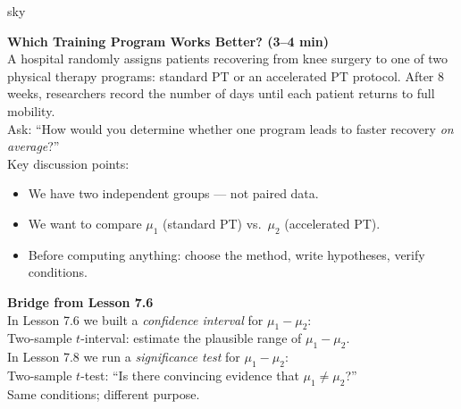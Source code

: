 \documentclass[10pt]{article}
\begin{document}
\begin{skillbox}[Hook]{sky}
\begin{minipage}[t]{0.55\linewidth}
    \textbf{Which Training Program Works Better? (3--4 min)}\\
    A hospital randomly assigns patients recovering from knee surgery to one of two
    physical therapy programs: standard PT or an accelerated PT protocol. After 8 weeks,
    researchers record the number of days until each patient returns to full mobility.\\[4pt]
    Ask: ``How would you determine whether one program leads to faster recovery
    \emph{on average}?''\\[4pt]
    Key discussion points:
    \begin{itemize}
        \item We have two independent groups --- not paired data.
        \item We want to compare $\mu_1$ (standard PT) vs.\ $\mu_2$ (accelerated PT).
        \item Before computing anything: choose the method, write hypotheses, verify conditions.
    \end{itemize}
\end{minipage}
\hfill
\begin{minipage}[t]{0.40\linewidth}
    \textbf{Bridge from Lesson 7.6}\\
    In Lesson 7.6 we built a \emph{confidence interval} for $\mu_1 - \mu_2$:\\[4pt]
    Two-sample $t$-interval: estimate the plausible range of $\mu_1 - \mu_2$.\\[6pt]
    In Lesson 7.8 we run a \emph{significance test} for $\mu_1 - \mu_2$:\\[4pt]
    Two-sample $t$-test: ``Is there convincing evidence that $\mu_1 \ne \mu_2$?''\\[6pt]
    Same conditions; different purpose.
\end{minipage}
\end{skillbox}
\end{document}

